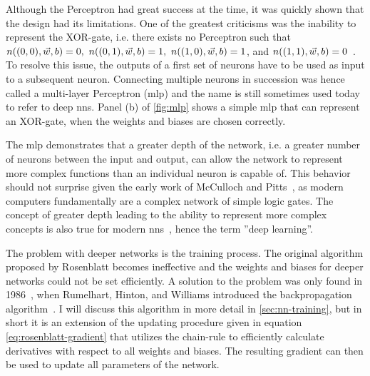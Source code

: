 Although the Perceptron had great success at the time, it was quickly shown that the design had its limitations. One of the greatest criticisms was the inability to represent the XOR-gate, i.e. there exists no Perceptron such that $n{\left( {\left( 0,0 \right)}, \vec{w}, b \right)}=0,\ n{\left( {\left( 0,1 \right)}, \vec{w}, b \right)}=1,\ n{\left( {\left( 1,0 \right)}, \vec{w}, b \right)}=1$, and $n{\left( {\left( 1,1 \right)}, \vec{w}, b \right)}=0$~\cite{Goodfellow:2016:DNN}. To resolve this issue, the outputs of a first set of neurons have to be used as input to a subsequent neuron. Connecting multiple neurons in succession was hence called a multi-layer Perceptron (\acrshort{mlp}) and the name is still sometimes used today to refer to deep \acrshort{nn}s. Panel (b) of \autoref{fig:mlp} shows a simple \acrshort{mlp} that can represent an XOR-gate, when the weights and biases are chosen correctly.

The \acrshort{mlp} demonstrates that a greater depth of the network, i.e. a greater number of neurons between the input and output, can allow the network to represent more complex functions than an individual neuron is capable of. This behavior should not surprise given the early work of McCulloch and Pitts~\cite{McCulloch:1943}, as modern computers fundamentally are a complex network of simple logic gates. The concept of greater depth leading to the ability to represent more complex concepts is also true for modern \acrshort{nn}s~\cite{He:2015aaa}, hence the term ''deep learning''.

The problem with deeper networks is the training process. The original algorithm proposed by Rosenblatt becomes ineffective and the weights and biases for deeper networks could not be set efficiently. A solution to the problem was only found in 1986~\cite{Geron:2017aaa}, when Rumelhart, Hinton, and Williams introduced the backpropagation algorithm~\cite{rumelhart1985:aaa}. I will discuss this algorithm in more detail in \autoref{sec:nn-training}, but in short it is an extension of the updating procedure given in equation \eqref{eq:rosenblatt-gradient} that utilizes the chain-rule to efficiently calculate derivatives with respect to all weights and biases. The resulting gradient can then be used to update all parameters of the network.


